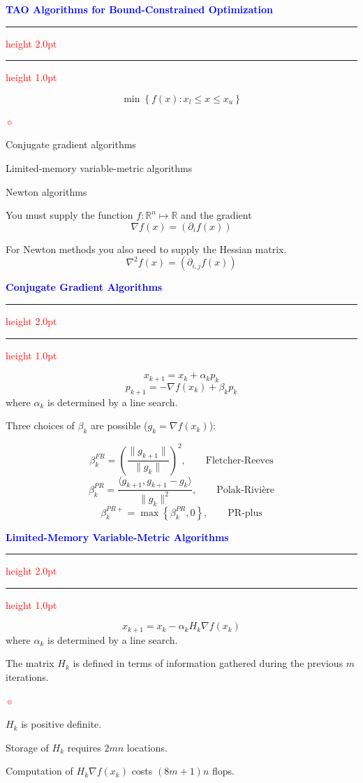 \documentclass{seminar}
\newcommand{\R}{\mbox{${\mathbb R}$}}
\newcommand{\grad}{\nabla}
\newcommand{\reddiamond}{\textcolor{red}{$\diamond$}}
\newcommand{\redstripe}{\textcolor{red}{\hrule height 2.0pt\hfil}
             \vspace{-1.8pt}
             \textcolor{red}{\hrule height 1.0pt\hfil}
}
\newcommand{\heading}[1]{%
   \centerline{\textcolor{blue}{\textbf{#1}}}%
    \redstripe%
    \bigskip
}
\begin{document}
\begin{slide}

\heading{TAO Algorithms for Bound-Constrained Optimization}

\[
\min \left \{  f(x) : x_l \le x \le x_u \right \}
\]

\medskip

\begin{list}{\reddiamond}{}
\item
Conjugate gradient algorithms
\item
Limited-memory variable-metric algorithms
\item
Newton algorithms
\end{list}

You must supply the function $ f : \R^n \mapsto \R $ and the
gradient 
\[
\grad f (x) = \left ( \partial _i f(x) \right )
\]

For Newton methods you also need to supply the Hessian matrix.
\[
\grad^2 f (x) = \left ( \partial_{i,j} f(x) \right )
\]

\vfill

\end{slide}

\begin{slide}

\heading{Conjugate Gradient Algorithms}

\[
x_{k+1} = x_k + \alpha_k p_k 
\]
\[
p_{k+1} = - \grad f (x_k) + \beta_k p_k 
\]
where $ \alpha_k $ is determined by a line search.

\medskip

Three choices of $ \beta_k $ are possible ($ g_k = \grad f (x_k ) $):
 
\[
\beta_k^{FR} = \left (
\frac{\| g_{k+1} \|}{\| g_k \|}
\right ) ^ 2 , \qquad \mbox{Fletcher-Reeves}
\]
\[
\beta_k^{PR} = 
\frac{ \langle g_{k+1} , g_{k+1} - g_k \rangle }
{\| g_k \|^2},  \qquad \mbox{Polak-Rivi\`ere}
\]
\[
\beta_k^{PR+} = \max \left \{ \beta_k^{PR} , 0 \right \} , \qquad
\mbox{PR-plus}
\]

\vfill

\end{slide}

\begin{slide}

\heading{Limited-Memory Variable-Metric Algorithms}

\[
x_{k+1} = x_k - \alpha_k H_k \grad f (x_k )
\]
where $ \alpha_k $ is determined by a line search.

\medskip 

The matrix $ H_k $ is defined in terms
of information gathered during the
previous $m$ iterations.

\medskip

\begin{list}{\reddiamond}{}
\item
$ H_k $ is positive definite.
\item
Storage of $ H_k $ requires $ 2 m n $ locations.
\item
Computation of $ H_k \grad f (x_k) $ costs
$ (8m+1) n $ flops.
\end{list}

\vfill

\end{slide}
\end{document}
